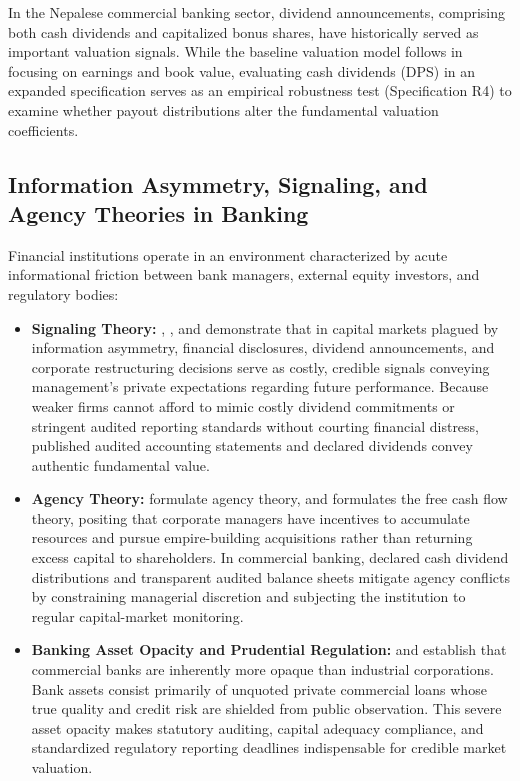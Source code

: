 In the Nepalese commercial banking sector, dividend announcements, comprising both cash dividends and capitalized bonus shares, have historically served as important valuation signals. While the baseline valuation model follows \citet{collins1997} in focusing on earnings and book value, evaluating cash dividends (DPS) in an expanded specification serves as an empirical robustness test (Specification R4) to examine whether payout distributions alter the fundamental valuation coefficients.

\subsection{Information Asymmetry, Signaling, and Agency Theories in Banking}
\label{subsec:signaling_agency}

Financial institutions operate in an environment characterized by acute informational friction between bank managers, external equity investors, and regulatory bodies:
\begin{itemize}
\item \textbf{Signaling Theory:} \citet{ross1977}, \citet{bhattacharya1979}, and \citet{john1985} demonstrate that in capital markets plagued by information asymmetry, financial disclosures, dividend announcements, and corporate restructuring decisions serve as costly, credible signals conveying management's private expectations regarding future performance. Because weaker firms cannot afford to mimic costly dividend commitments or stringent audited reporting standards without courting financial distress, published audited accounting statements and declared dividends convey authentic fundamental value.
\item \textbf{Agency Theory:} \citet{jensen1976} formulate agency theory, and \citet{jensen1986} formulates the free cash flow theory, positing that corporate managers have incentives to accumulate resources and pursue empire-building acquisitions rather than returning excess capital to shareholders. In commercial banking, declared cash dividend distributions and transparent audited balance sheets mitigate agency conflicts by constraining managerial discretion and subjecting the institution to regular capital-market monitoring.
\item \textbf{Banking Asset Opacity and Prudential Regulation:} \citet{morgan2002} and \citet{flannery2004} establish that commercial banks are inherently more opaque than industrial corporations. Bank assets consist primarily of unquoted private commercial loans whose true quality and credit risk are shielded from public observation. This severe asset opacity makes statutory auditing, capital adequacy compliance, and standardized regulatory reporting deadlines indispensable for credible market valuation.
\end{itemize}

